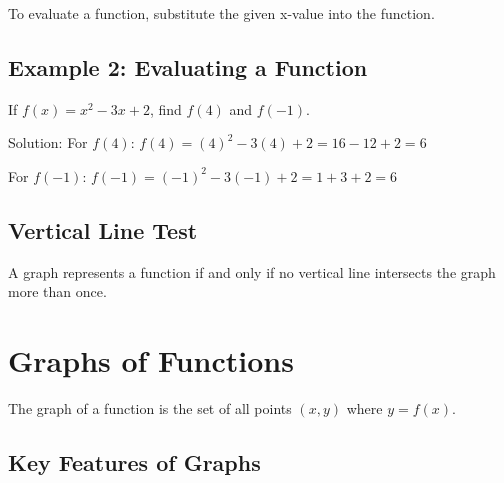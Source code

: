 \documentclass[12pt]{article}
\begin{document}
To evaluate a function, substitute the given x-value into the function.

\subsection{Example 2: Evaluating a Function}

If $f(x) = x^2 - 3x + 2$, find $f(4)$ and $f(-1)$.

Solution:
For $f(4)$: 
$f(4) = (4)^2 - 3(4) + 2 = 16 - 12 + 2 = 6$

For $f(-1)$:
$f(-1) = (-1)^2 - 3(-1) + 2 = 1 + 3 + 2 = 6$

\subsection{Vertical Line Test}

A graph represents a function if and only if no vertical line intersects the graph more than once.

\begin{center}
\end{center}

\section{Graphs of Functions}

The graph of a function is the set of all points $(x, y)$ where $y = f(x)$.

\subsection{Key Features of Graphs}
\end{document}
